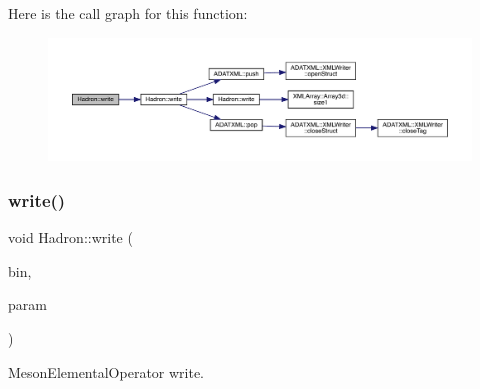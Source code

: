 Here is the call graph for this function\+:
\nopagebreak
\begin{figure}[H]
\begin{center}
\leavevmode
\includegraphics[width=350pt]{d1/daf/namespaceHadron_a97d7de65e3fea244c875c2cb76decfda_cgraph}
\end{center}
\end{figure}
\mbox{\label{namespaceHadron_af16b79349f97386286cfc1cd9dfb73f0}} 
\subsubsection{\texorpdfstring{write()}{write()}\hspace{0.1cm}{\footnotesize\ttfamily [63/95]}}
{\footnotesize\ttfamily void Hadron\+::write (\begin{DoxyParamCaption}\item[{\mbox{\hyperlink{classADATIO_1_1BinaryWriter}{Binary\+Writer}} \&}]{bin,  }\item[{const \mbox{\hyperlink{structHadron_1_1ValMesonElementalOperator__t}{Val\+Meson\+Elemental\+Operator\+\_\+t}} \&}]{param }\end{DoxyParamCaption})}



Meson\+Elemental\+Operator write. 


